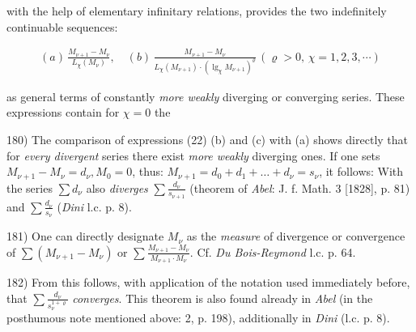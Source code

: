 with the help of elementary infinitary relations, provides the two indefinitely continuable sequences:

\vspace{-0.5cm}
\begin{align}
    (a) \, \frac{M_{\nu+1} - M_\nu}{L_\chi(M_\nu)}, \quad (b) \, \frac{M_{\nu+1} - M_\nu}{L_\chi(M_{\nu+1}) \cdot (\lg_\chi M_{\nu+1})^\varrho} \, (\varrho > 0, \, \chi=1,2,3,\cdots)
\end{align}
\vspace{-0.3cm}

as general terms of constantly \textit{more weakly} diverging or converging series. These expressions contain for $\chi = 0$ the

\vfill
\leftline{\rule{2in}{0.4pt}}
\vspace{0.2cm}
{
\footnotesize
180) The comparison of expressions (22) (b) and (c) with (a) shows directly that for \textit{every divergent} series there exist \textit{more weakly} diverging ones. If one sets $M_{\nu+1} - M_\nu = d_\nu, M_0 = 0$, thus: $M_{\nu+1} = d_0 + d_1 + \ldots + d_\nu = s_\nu$, it follows: With the series $\sum d_\nu$ also \textit{diverges} $\sum \frac{d_\nu}{s_{\nu+1}}$ (theorem of \textit{Abel}: J. f. Math. 3 [1828], p. 81) and $\sum \frac{d_\nu}{s_\nu}$ (\textit{Dini} l.c. p. 8).

181) One can directly designate $M_\nu$ as the \textit{measure} of divergence or convergence of $\sum (M_{\nu+1} - M_\nu)$ or $\sum \frac{M_{\nu+1} - M_\nu}{M_{\nu+1} \cdot M_\nu}$. Cf. \textit{Du Bois-Reymond} l.c. p. 64.

182) From this follows, with application of the notation used immediately before, that $\sum \frac{d_\nu}{s_\nu^{1+\varrho}}$ \textit{converges}. This theorem is also found already in \textit{Abel} (in the posthumous note mentioned above: 2, p. 198), additionally in \textit{Dini} (l.c. p. 8).

}